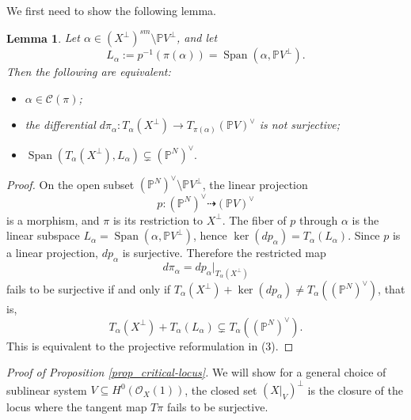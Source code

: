 \documentclass[12pt]{amsart}
\newtheorem{lemma}[theorem]{Lemma}
\begin{document}
We first need to show the following lemma.

\begin{lemma}\label{lemma_C(pi)general}
Let $\alpha\in (X^\perp)^{sm}\setminus \mathbb PV^\perp$, and let
\[
L_\alpha:=p^{-1}(\pi(\alpha))
=\operatorname{Span}(\alpha,\mathbb PV^\perp).
\]
Then the following are equivalent:
\begin{itemize}
\item[(1)] $\alpha\in \mathcal C(\pi)$;
\item[(2)] the differential $d\pi_\alpha:T_\alpha(X^\perp)\to T_{\pi(\alpha)}(\mathbb PV)^\vee$
is not surjective;
\item[(3)] 
$\operatorname{Span}(T_\alpha(X^\perp),L_\alpha)
\subsetneq (\mathbb P^N)^\vee.$

\end{itemize}

\end{lemma}

\begin{proof}
On the open subset $(\mathbb P^N)^\vee\setminus \mathbb PV^\perp$, the linear
projection
\[
p:(\mathbb P^N)^\vee\dashrightarrow (\mathbb PV)^\vee
\]
is a morphism, and $\pi$ is its restriction to $X^\perp$.
The fiber of $p$ through $\alpha$ is the linear subspace
$L_\alpha=\operatorname{Span}(\alpha,\mathbb PV^\perp)$,
hence $\ker(dp_\alpha)=T_\alpha(L_\alpha)$.
Since $p$ is a linear projection, $dp_\alpha$ is surjective. Therefore the
restricted map
\[
d\pi_\alpha=dp_\alpha|_{T_\alpha(X^\perp)}
\]
fails to be surjective if and only if $T_\alpha(X^\perp)+\ker(dp_\alpha)
\neq T_\alpha((\mathbb P^N)^\vee)$,
that is,
\[
T_\alpha(X^\perp)+T_\alpha(L_\alpha)
\subsetneq T_\alpha((\mathbb P^N)^\vee).
\]
This is equivalent to the projective reformulation in (3).
\end{proof}


\noindent\textit{Proof of Proposition \ref{prop_critical-locus}.}
We will show for a general choice of sublinear system $V\subseteq H^0(\mathcal O_X(1))$, the closed set $(X|_V)^{\perp}$ is the closure of the locus where the tangent map $T\pi$ fails to be surjective.

\end{document}
